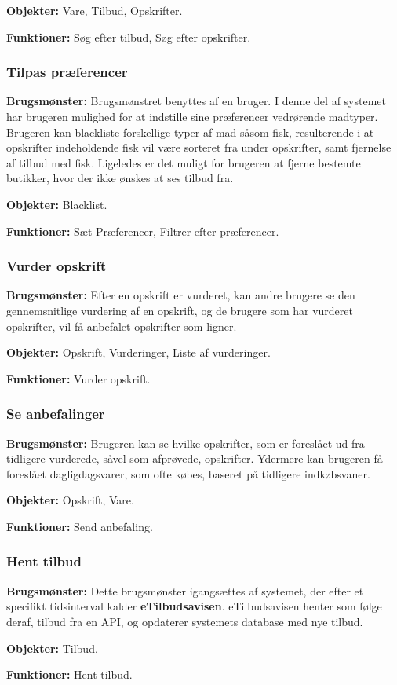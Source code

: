 \textbf{Objekter:} Vare, Tilbud, Opskrifter.

\textbf{Funktioner:} Søg efter tilbud, Søg efter opskrifter.

\subsubsection*{Tilpas præferencer}
\textbf{Brugsmønster:} Brugsmønstret benyttes af en bruger.
I denne del af systemet har brugeren mulighed for at indstille sine præferencer vedrørende madtyper.
Brugeren kan blackliste forskellige typer af mad såsom fisk, resulterende i at opskrifter indeholdende fisk vil være sorteret fra under opskrifter, samt fjernelse af tilbud med fisk. 
Ligeledes er det muligt for brugeren at fjerne bestemte butikker, hvor der ikke ønskes at ses tilbud fra.

\textbf{Objekter:} Blacklist.

\textbf{Funktioner:} Sæt Præferencer, Filtrer efter præferencer.

\subsubsection*{Vurder opskrift}
\textbf{Brugsmønster:} 
Efter en opskrift er vurderet, kan andre brugere se den gennemsnitlige vurdering af en opskrift, og de brugere som har vurderet opskrifter, vil få anbefalet opskrifter som ligner.

\textbf{Objekter:} Opskrift, Vurderinger, Liste af vurderinger.

\textbf{Funktioner:} Vurder opskrift.

\subsubsection*{Se anbefalinger}
\textbf{Brugsmønster:} Brugeren kan se hvilke opskrifter, som er foreslået ud fra tidligere vurderede, såvel som afprøvede, opskrifter.
Ydermere kan brugeren få foreslået dagligdagsvarer, som ofte købes, baseret på tidligere indkøbsvaner.

\textbf{Objekter:} Opskrift, Vare.

\textbf{Funktioner:} Send anbefaling.

\subsubsection*{Hent tilbud}
\textbf{Brugsmønster:} Dette brugsmønster igangsættes af systemet, der efter et specifikt tidsinterval kalder \textbf{eTilbudsavisen}.
eTilbudsavisen henter som følge deraf, tilbud fra en API, og opdaterer systemets database med nye tilbud.

\textbf{Objekter:} Tilbud.

\textbf{Funktioner:} Hent tilbud.